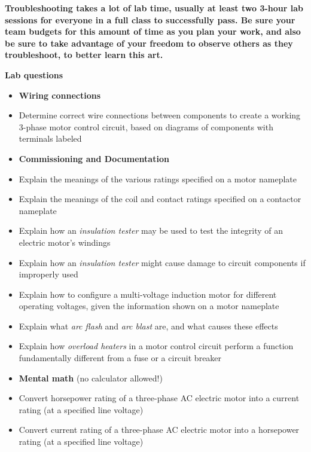 \vskip 10pt

{\bf Troubleshooting takes a lot of lab time, usually at least two 3-hour lab sessions for everyone in a full class to successfully pass.  Be sure your team budgets for this amount of time as you plan your work, and also be sure to take advantage of your freedom to observe others as they troubleshoot, to better learn this art.}




\vfil \eject

\noindent
{\bf Lab questions}

\vskip 5pt

\begin{itemize}
\item{} {\bf Wiring connections}
\item{} Determine correct wire connections between components to create a working 3-phase motor control circuit, based on diagrams of components with terminals labeled
\end{itemize}

\filbreak

\begin{itemize}
\item{} {\bf Commissioning and Documentation}
\item{} Explain the meanings of the various ratings specified on a motor nameplate
\item{} Explain the meanings of the coil and contact ratings specified on a contactor nameplate
\item{} Explain how an {\it insulation tester} may be used to test the integrity of an electric motor's windings
\item{} Explain how an {\it insulation tester} might cause damage to circuit components if improperly used
\item{} Explain how to configure a multi-voltage induction motor for different operating voltages, given the information shown on a motor nameplate
\item{} Explain what {\it arc flash} and {\it arc blast} are, and what causes these effects
\item{} Explain how {\it overload heaters} in a motor control circuit perform a function fundamentally different from a fuse or a circuit breaker
\end{itemize}

\filbreak

\begin{itemize}
\item{} {\bf Mental math} (no calculator allowed!)
\item{} Convert horsepower rating of a three-phase AC electric motor into a current rating (at a specified line voltage)
\item{} Convert current rating of a three-phase AC electric motor into a horsepower rating (at a specified line voltage)
\end{itemize}

